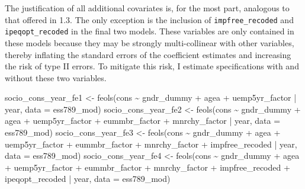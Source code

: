 \documentclass[
]{article}
\newenvironment{Shaded}{\begin{snugshade}}{\end{snugshade}}
\newcommand{\AttributeTok}[1]{\textcolor[rgb]{0.77,0.63,0.00}{#1}}
\newcommand{\FunctionTok}[1]{\textcolor[rgb]{0.00,0.00,0.00}{#1}}
\newcommand{\NormalTok}[1]{#1}
\newcommand{\OtherTok}[1]{\textcolor[rgb]{0.56,0.35,0.01}{#1}}
\newcommand{\SpecialCharTok}[1]{\textcolor[rgb]{0.00,0.00,0.00}{#1}}
\begin{document}
The justification of all additional covariates is, for the most part,
analogous to that offered in 1.3. The only exception is the inclusion of
\texttt{impfree\_recoded} and \texttt{ipeqopt\_recoded} in the final two
models. These variables are only contained in these models because they
may be strongly multi-collinear with other variables, thereby inflating
the standard errors of the coefficient estimates and increasing the risk
of type II errors. To mitigate this risk, I estimate specifications with
and without these two variables.

\begin{Shaded}
\begin{Highlighting}[]
\NormalTok{socio\_cons\_year\_fe1 }\OtherTok{\textless{}{-}} \FunctionTok{feols}\NormalTok{(cons }\SpecialCharTok{\textasciitilde{}}\NormalTok{ gndr\_dummy }\SpecialCharTok{+}\NormalTok{ agea }\SpecialCharTok{+}\NormalTok{ uemp5yr\_factor }\SpecialCharTok{|}\NormalTok{ year, }\AttributeTok{data =}\NormalTok{ ess789\_mod)}
\NormalTok{socio\_cons\_year\_fe2 }\OtherTok{\textless{}{-}} \FunctionTok{feols}\NormalTok{(cons }\SpecialCharTok{\textasciitilde{}}\NormalTok{ gndr\_dummy }\SpecialCharTok{+}\NormalTok{ agea }\SpecialCharTok{+}\NormalTok{ uemp5yr\_factor }\SpecialCharTok{+} 
\NormalTok{                              eummbr\_factor }\SpecialCharTok{+}\NormalTok{ mnrchy\_factor }\SpecialCharTok{|}\NormalTok{ year, }\AttributeTok{data =}\NormalTok{ ess789\_mod)}
\NormalTok{socio\_cons\_year\_fe3 }\OtherTok{\textless{}{-}} \FunctionTok{feols}\NormalTok{(cons }\SpecialCharTok{\textasciitilde{}}\NormalTok{ gndr\_dummy }\SpecialCharTok{+}\NormalTok{ agea }\SpecialCharTok{+}\NormalTok{ uemp5yr\_factor }\SpecialCharTok{+} 
\NormalTok{                              eummbr\_factor }\SpecialCharTok{+}\NormalTok{ mnrchy\_factor }\SpecialCharTok{+}\NormalTok{ impfree\_recoded }\SpecialCharTok{|}\NormalTok{ year, }\AttributeTok{data =}\NormalTok{ ess789\_mod)}
\NormalTok{socio\_cons\_year\_fe4 }\OtherTok{\textless{}{-}} \FunctionTok{feols}\NormalTok{(cons }\SpecialCharTok{\textasciitilde{}}\NormalTok{ gndr\_dummy }\SpecialCharTok{+}\NormalTok{ agea }\SpecialCharTok{+}\NormalTok{ uemp5yr\_factor }\SpecialCharTok{+} 
\NormalTok{                              eummbr\_factor }\SpecialCharTok{+}\NormalTok{ mnrchy\_factor }\SpecialCharTok{+}\NormalTok{ impfree\_recoded }\SpecialCharTok{+}\NormalTok{ ipeqopt\_recoded }\SpecialCharTok{|}\NormalTok{ year, }\AttributeTok{data =}\NormalTok{ ess789\_mod)}


\end{Highlighting}
\end{Shaded}
\end{document}
